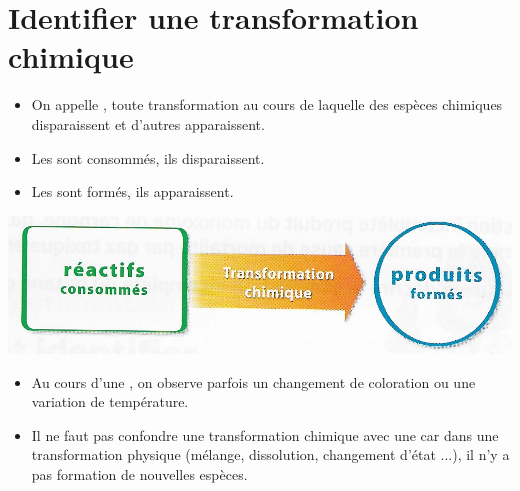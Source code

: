 \documentclass[12pt,a4paper]{article}
\begin{document}
	
	

\section{Identifier une transformation chimique}


\begin{mybilan}
	\begin{itemize}
		\item On appelle , toute transformation au cours de laquelle des espèces chimiques disparaissent et d'autres apparaissent.
		\item Les  sont consommés, ils disparaissent.
		\item Les  sont formés, ils apparaissent.
	\end{itemize}
\end{mybilan}



\begin{center}
	\includegraphics[scale=0.5]{img/transfo}
\end{center}

\begin{myrems}
	\begin{itemize}
		\item Au cours d'une , on observe parfois un changement de coloration ou une variation de température.
		\item Il ne faut pas confondre une transformation chimique avec une  car dans une transformation physique (mélange, dissolution, changement d'état ...), il n'y a pas formation de nouvelles espèces.
	\end{itemize}
\end{myrems}
\end{document}

